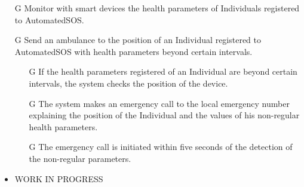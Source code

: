 \documentclass[../../rasd.tex]{subfiles}
\begin{document}
\begin{itemize}
				\item[G\subs{8}]Monitor with smart devices the health parameters of Individuals registered to AutomatedSOS.
					
				\item[G\subs{9}]Send an ambulance to the position of an Individual registered to AutomatedSOS with health parameters beyond certain intervals.
					\begin{itemize}
						\item[G\subs{9.1}]If the health parameters registered of an Individual are beyond certain intervals, the system checks the position of the device.
						\item[G\subs{9.2}]The system makes an emergency call to the local emergency number explaining the position of the Individual and the values of his non-regular health parameters.
						\item[G\subs{9.3}]The emergency call is initiated within five seconds of the detection of the non-regular parameters.
					\end{itemize}


				\item WORK IN PROGRESS
			\end{itemize}
			
			
\end{document}
